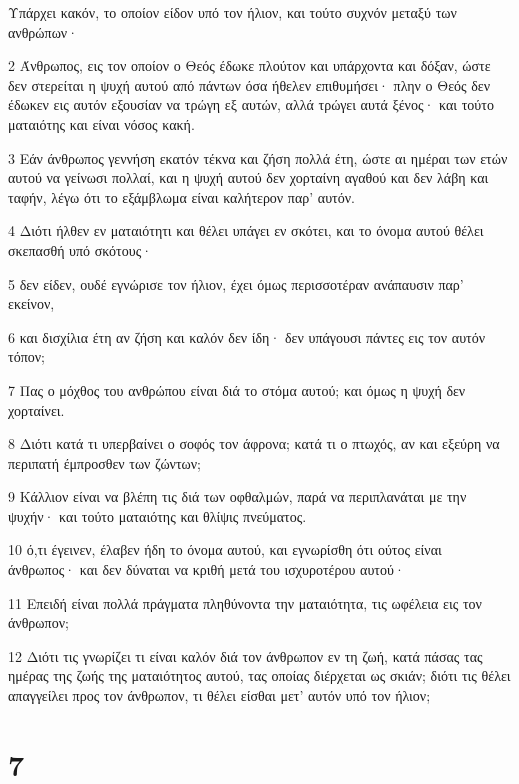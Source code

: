 \par Υπάρχει κακόν, το οποίον είδον υπό τον ήλιον, και τούτο συχνόν μεταξύ των ανθρώπων·
\par 2 Άνθρωπος, εις τον οποίον ο Θεός έδωκε πλούτον και υπάρχοντα και δόξαν, ώστε δεν στερείται η ψυχή αυτού από πάντων όσα ήθελεν επιθυμήσει· πλην ο Θεός δεν έδωκεν εις αυτόν εξουσίαν να τρώγη εξ αυτών, αλλά τρώγει αυτά ξένος· και τούτο ματαιότης και είναι νόσος κακή.
\par 3 Εάν άνθρωπος γεννήση εκατόν τέκνα και ζήση πολλά έτη, ώστε αι ημέραι των ετών αυτού να γείνωσι πολλαί, και η ψυχή αυτού δεν χορταίνη αγαθού και δεν λάβη και ταφήν, λέγω ότι το εξάμβλωμα είναι καλήτερον παρ' αυτόν.
\par 4 Διότι ήλθεν εν ματαιότητι και θέλει υπάγει εν σκότει, και το όνομα αυτού θέλει σκεπασθή υπό σκότους·
\par 5 δεν είδεν, ουδέ εγνώρισε τον ήλιον, έχει όμως περισσοτέραν ανάπαυσιν παρ' εκείνον,
\par 6 και δισχίλια έτη αν ζήση και καλόν δεν ίδη· δεν υπάγουσι πάντες εις τον αυτόν τόπον;
\par 7 Πας ο μόχθος του ανθρώπου είναι διά το στόμα αυτού; και όμως η ψυχή δεν χορταίνει.
\par 8 Διότι κατά τι υπερβαίνει ο σοφός τον άφρονα; κατά τι ο πτωχός, αν και εξεύρη να περιπατή έμπροσθεν των ζώντων;
\par 9 Κάλλιον είναι να βλέπη τις διά των οφθαλμών, παρά να περιπλανάται με την ψυχήν· και τούτο ματαιότης και θλίψις πνεύματος.
\par 10 ό,τι έγεινεν, έλαβεν ήδη το όνομα αυτού, και εγνωρίσθη ότι ούτος είναι άνθρωπος· και δεν δύναται να κριθή μετά του ισχυροτέρου αυτού·
\par 11 Επειδή είναι πολλά πράγματα πληθύνοντα την ματαιότητα, τις ωφέλεια εις τον άνθρωπον;
\par 12 Διότι τις γνωρίζει τι είναι καλόν διά τον άνθρωπον εν τη ζωή, κατά πάσας τας ημέρας της ζωής της ματαιότητος αυτού, τας οποίας διέρχεται ως σκιάν; διότι τις θέλει απαγγείλει προς τον άνθρωπον, τι θέλει είσθαι μετ' αυτόν υπό τον ήλιον;

\chapter{7}

